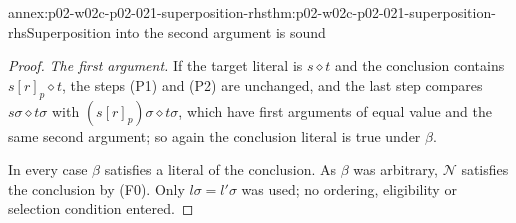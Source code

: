\begin{annexitem}{annex:p02-w02c-p02-021-superposition-rhs}{thm:p02-w02c-p02-021-superposition-rhs}{Superposition into the second argument is sound}
\begin{proof}
\emph{The first argument.}  If the target literal is \(s\mathrel{\diamond}t\)
and the conclusion contains \(s[r]_p\mathrel{\diamond}t\), the steps (P1) and
(P2) are unchanged, and the last step compares
\(s\sigma\mathrel{\diamond}t\sigma\) with
\((s[r]_p)\sigma\mathrel{\diamond}t\sigma\), which have first arguments of
equal value and the same second argument; so again the conclusion literal is
true under \(\beta\).

In every case \(\beta\) satisfies a literal of the conclusion.  As \(\beta\)
was arbitrary, \(\mathcal N\) satisfies the conclusion by (F0).  Only
\(l\sigma=l'\sigma\) was used; no ordering, eligibility or selection
condition entered.
\end{proof}
\end{annexitem}
